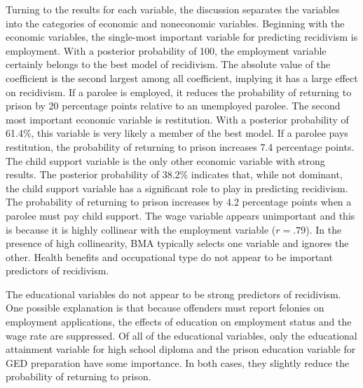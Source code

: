 Turning to the results for each variable, the discussion separates the variables into the categories of economic and noneconomic variables.  Beginning with the economic variables, the single-most important variable for predicting recidivism is employment.  With a posterior probability of 100, the employment variable certainly belongs to the best model of recidivism.  The absolute value of the coefficient is the second largest among all coefficient, implying it has a large effect on recidivism.  If a parolee is employed, it reduces the probability of returning to prison by 20 percentage points relative to an unemployed parolee.  The second most important economic variable is restitution.  With a posterior probability of 61.4\%, this variable is very likely a member of the best model.  If a parolee pays restitution, the probability of returning to prison increases 7.4 percentage points.  The child support variable is the only other economic variable with strong results.  The posterior probability of 38.2\% indicates that, while not dominant, the child support variable has a significant role to play in predicting recidivism.  The probability of returning to prison increases by 4.2 percentage points when a parolee must pay child support. The wage variable appears unimportant and this is because it is highly collinear with the employment variable ($r=.79$).  In the presence of high collinearity, BMA typically selects one variable and ignores the other.  Health benefits and occupational type do not appear to be important predictors of recidivism.

The educational variables do not appear to be strong predictors of recidivism.  One possible explanation is that because offenders must report felonies on employment applications, the effects of education on employment status and the wage rate are suppressed.  Of all of the educational variables, only the educational attainment variable for high school diploma and the prison education variable for GED preparation have some importance.  In both cases, they slightly reduce the probability of returning to prison.

